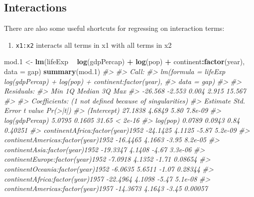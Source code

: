 \documentclass[]{book}
\newenvironment{Shaded}{\begin{snugshade}}{\end{snugshade}}
\newcommand{\CommentTok}[1]{\textcolor[rgb]{0.56,0.35,0.01}{\textit{#1}}}
\newcommand{\DataTypeTok}[1]{\textcolor[rgb]{0.13,0.29,0.53}{#1}}
\newcommand{\FloatTok}[1]{\textcolor[rgb]{0.00,0.00,0.81}{#1}}
\newcommand{\KeywordTok}[1]{\textcolor[rgb]{0.13,0.29,0.53}{\textbf{#1}}}
\newcommand{\NormalTok}[1]{#1}
\newcommand{\OperatorTok}[1]{\textcolor[rgb]{0.81,0.36,0.00}{\textbf{#1}}}
\newcommand{\StringTok}[1]{\textcolor[rgb]{0.31,0.60,0.02}{#1}}
\providecommand{\tightlist}{%
  \setlength{\itemsep}{0pt}\setlength{\parskip}{0pt}}
\begin{document}
\hypertarget{interactions}{%
\subsection{Interactions}\label{interactions}}

There are also some useful shortcuts for regressing on interaction terms:

\begin{enumerate}
\def\labelenumi{\arabic{enumi}.}
\tightlist
\item
  \texttt{x1:x2} interacts all terms in x1 with all terms in x2
\end{enumerate}

\begin{Shaded}
\begin{Highlighting}[]
\NormalTok{mod}\FloatTok{.1}\NormalTok{ <-}\StringTok{ }\KeywordTok{lm}\NormalTok{(lifeExp }\OperatorTok{~}\StringTok{ }\KeywordTok{log}\NormalTok{(gdpPercap) }\OperatorTok{+}\StringTok{ }\KeywordTok{log}\NormalTok{(pop) }\OperatorTok{+}\StringTok{ }\NormalTok{continent}\OperatorTok{:}\KeywordTok{factor}\NormalTok{(year), }\DataTypeTok{data =}\NormalTok{ gap)}
\KeywordTok{summary}\NormalTok{(mod}\FloatTok{.1}\NormalTok{)}
\CommentTok{#> }
\CommentTok{#> Call:}
\CommentTok{#> lm(formula = lifeExp ~ log(gdpPercap) + log(pop) + continent:factor(year), }
\CommentTok{#>     data = gap)}
\CommentTok{#> }
\CommentTok{#> Residuals:}
\CommentTok{#>     Min      1Q  Median      3Q     Max }
\CommentTok{#> -26.568  -2.553   0.004   2.915  15.567 }
\CommentTok{#> }
\CommentTok{#> Coefficients: (1 not defined because of singularities)}
\CommentTok{#>                                    Estimate Std. Error t value Pr(>|t|)}
\CommentTok{#> (Intercept)                         27.1838     4.6849    5.80  7.8e-09}
\CommentTok{#> log(gdpPercap)                       5.0795     0.1605   31.65  < 2e-16}
\CommentTok{#> log(pop)                             0.0789     0.0943    0.84  0.40251}
\CommentTok{#> continentAfrica:factor(year)1952   -24.1425     4.1125   -5.87  5.2e-09}
\CommentTok{#> continentAmericas:factor(year)1952 -16.4465     4.1663   -3.95  8.2e-05}
\CommentTok{#> continentAsia:factor(year)1952     -19.3347     4.1408   -4.67  3.3e-06}
\CommentTok{#> continentEurope:factor(year)1952    -7.0918     4.1352   -1.71  0.08654}
\CommentTok{#> continentOceania:factor(year)1952   -6.0635     5.6511   -1.07  0.28344}
\CommentTok{#> continentAfrica:factor(year)1957   -22.4964     4.1098   -5.47  5.1e-08}
\CommentTok{#> continentAmericas:factor(year)1957 -14.3673     4.1643   -3.45  0.00057}

\end{Highlighting}
\end{Shaded}
\end{document}

